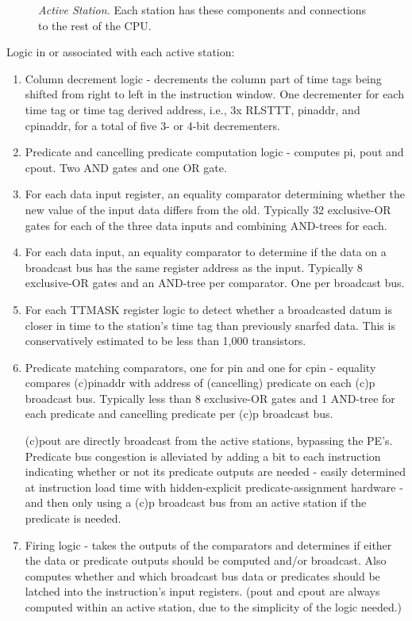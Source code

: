 \documentclass[10pt,dvips]{article}
\begin{document}
\begin{figure}
\centering
{}
\caption{{\em Active Station.} Each station has these components and connections to
the rest of the CPU.}
\label{activestation}
\end{figure}


Logic in or associated with each active station:
\begin{enumerate}
\item Column decrement logic - decrements the column part of time tags being
shifted from right to left in the instruction window. One decrementer for each time tag
or time tag derived address, i.e., 3x RLSTTT, pinaddr, and cpinaddr, for a total of five
3- or 4-bit decrementers.

\item Predicate and cancelling predicate computation logic - computes pi, pout and
cpout. Two AND gates and one OR gate.

\item For each data input register, an equality comparator determining whether the new
value of the input data differs from the old. Typically 32 exclusive-OR gates for
each of the three data inputs and combining AND-trees for each. 

\item For each data input, an equality comparator to determine if the data on a
broadcast bus has the same register address as the input. 
Typically 8 exclusive-OR gates and an AND-tree per comparator.
One per broadcast bus.

\item For each TTMASK register logic to detect whether a broadcasted datum is
closer in time to the station's time tag than previously snarfed data.
This is conservatively estimated to be less than 1,000 transistors.

\item Predicate matching comparators, one for pin and one for cpin - equality
compares (c)pinaddr with address of (cancelling) predicate on each (c)p broadcast bus.
Typically less than 
8 exclusive-OR gates and 1 AND-tree for each predicate and cancelling
predicate per (c)p broadcast bus. 

(c)pout are directly broadcast
from the active stations, bypassing the PE's.
Predicate bus congestion is alleviated by adding a bit
to each instruction indicating whether or not
its predicate outputs are needed - easily determined at instruction
load time with hidden-explicit
predicate-assignment hardware - and then only using a (c)p
broadcast bus from an active station if the predicate is needed.

\item Firing logic - takes the outputs of the comparators and determines if either
the data or predicate outputs should be computed and/or broadcast. Also computes
whether and which broadcast bus data or predicates should be latched into the
instruction's input registers. (pout and cpout
are always computed within an active station, due to the simplicity of the logic
needed.)

\end{enumerate}
\end{document}
